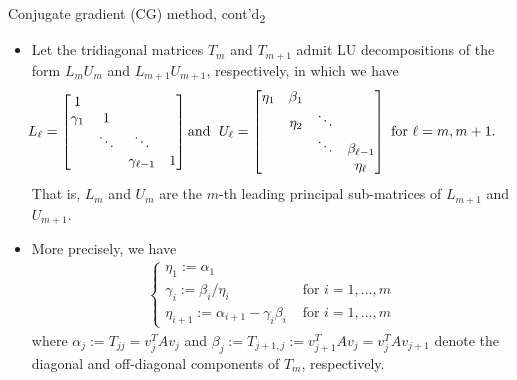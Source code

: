 \documentclass[t,usepdftitle=false]{beamer}
\begin{document}
\begin{frame}{Conjugate gradient (CG) method, cont'd\textsubscript{2}}
\begin{itemize}
\item[]Let the tridiagonal matrices $T_{m}$ and $T_{m+1}$ admit LU decompositions of the form $L_mU_m$ and $L_{m+1}U_{m+1}$, respectively, in which we have
\begin{align*}
\hspace{-.5cm}
L_\ell=
\begin{bmatrix}
1\\
\gamma_1&1\\
&\ddots&\ddots\\
&&\gamma_{\ell-1}&1
\end{bmatrix}
\text{and }\;
U_\ell=
\begin{bmatrix}
\eta_1&\beta_1\\
&\eta_2&\ddots\\
&&\ddots&\beta_{\ell-1}\\
&&&\eta_\ell
\end{bmatrix}
\text{ for }
\ell=m,m+1.
\end{align*}
That is, $L_m$ and $U_m$ are the $m$-th leading principal sub-matrices of $L_{m+1}$ and $U_{m+1}$.
\item[] More precisely, we have
\begin{align*}
\begin{cases*}
\eta_1:=\alpha_1\\
\gamma_i:=\beta_i/\eta_i&\text{ for }i=1,\dots,m\\
\eta_{i+1}:=\alpha_{i+1}-\gamma_i\beta_i&\text{ for }i=1,\dots,m
\end{cases*}
\end{align*}
where $\alpha_j:=T_{jj}=v_j^TAv_j$ and $\beta_j:=T_{j+1,j}:=v_{j+1}^TAv_j=v_j^TAv_{j+1}$ denote the diagonal and off-diagonal components of $T_m$, respectively.
\end{itemize}
\end{frame}
\end{document}
